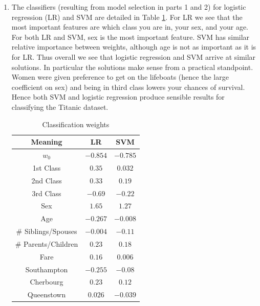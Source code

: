 \documentclass[10pt]{article}
\begin{document}
\begin{enumerate}
 \item The classifiers (resulting from model selection in parts 1 and 2) for logistic regression (LR) and SVM are detailed in Table \ref{weights}. For LR we see that the most important features are which class you are in, your sex, and your age. For both LR and SVM, sex is the most important feature.  SVM has similar relative importance between weights, although age is not as important as it is for LR. Thus overall we see that logistic regression and SVM arrive at similar solutions. In particular the solutions make sense from a practical standpoint. Women were given preference to get on the lifeboats (hence the large coefficient on sex) and being in third class lowers your chances of survival. Hence both SVM and logistic regression produce sensible results for classifying the Titanic dataset.
 \begin{table}[H]
 \begin{tabular}{|c|c|c|}
 \hline
 Meaning & LR & SVM \\ \hline
 $w_0$ & $-0.854$ & $-0.785$ \\ \hline
 1st Class & $0.35$ & $0.032$\\ \hline
 2nd Class & $0.33$ & $0.19$\\ \hline
 3rd Class & $-0.69$ & $-0.22$\\ \hline
 Sex  & $1.65$ & $1.27$\\ \hline
 Age & $-0.267$ & $-0.008$\\ \hline
 \# Siblings/Spouses & $-0.004$ & $-0.11$ \\ \hline
 \# Parents/Children & $0.23$ & $0.18$\\ \hline
 Fare & $0.16$ & $0.006$\\ \hline
 Southampton & $-0.255$ & $-0.08$ \\ \hline
 Cherbourg & $0.23$ & $0.12$\\ \hline
 Queenstown & $0.026$ & $-0.039$\\ \hline
 \end{tabular}
 \caption{Classification weights}
 \label{weights}
 \end{table}


\end{enumerate}
\end{document}
